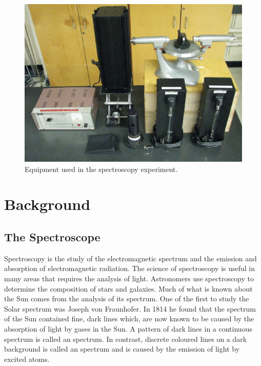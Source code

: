 \begin{figure}[H]
    \centering
    \includegraphics[scale = 0.8]{Images/SPEC1.PNG}
    \caption{Equipment used in the spectroscopy experiment.}
    \label{fig:SPEC1}
\end{figure}


\section{Background}

\subsection{The Spectroscope}

Spectroscopy is the study of the electromagnetic spectrum and the emission and absorption of electromagnetic radiation. The science of spectroscopy is useful in many areas that requires the analysis of light. Astronomers use spectroscopy to determine the composition of stars and galaxies. Much of what is known about the Sun comes from the analysis of its spectrum. One of the first to study the Solar spectrum was Joseph von Fraunhofer. In 1814 he found that the spectrum of the Sun contained fine, dark lines which, are now known to be caused by the absorption of light by gases in the Sun. A pattern of dark lines in a continuous spectrum is called an  spectrum. In contrast, discrete coloured lines on a dark background is called an  spectrum and is caused by the emission of light by excited atoms.

